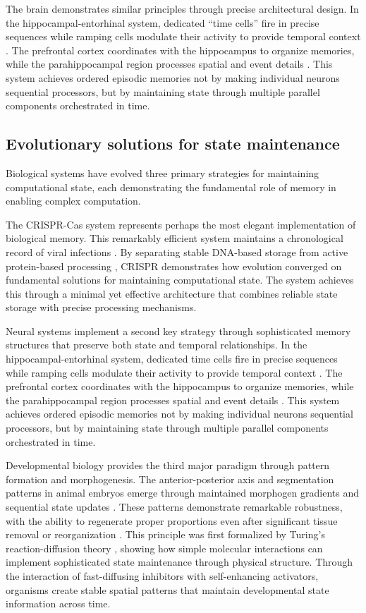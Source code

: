 \documentclass[12pt]{article}
\begin{document}
The brain demonstrates similar principles through precise architectural design.
In the hippocampal-entorhinal system, dedicated ``time cells'' fire in precise sequences while ramping cells modulate their activity to provide temporal context \cite{quentin2019differential}.
The prefrontal cortex coordinates with the hippocampus to organize memories, while the parahippocampal region processes spatial and event details \cite{martini2015information}.
This system achieves ordered episodic memories not by making individual neurons sequential processors, but by maintaining state through multiple parallel components orchestrated in time.

\subsection{Evolutionary solutions for state maintenance}

Biological systems have evolved three primary strategies for maintaining computational state, each demonstrating the fundamental role of memory in enabling complex computation.

The CRISPR-Cas system represents perhaps the most elegant implementation of biological memory.
This remarkably efficient system maintains a chronological record of viral infections \cite{kim2019crispr}.
By separating stable DNA-based storage from active protein-based processing \cite{sadremomtaz2023digital}, CRISPR demonstrates how evolution converged on fundamental solutions for maintaining computational state.
The system achieves this through a minimal yet effective architecture that combines reliable state storage with precise processing mechanisms.

Neural systems implement a second key strategy through sophisticated memory structures that preserve both state and temporal relationships.
In the hippocampal-entorhinal system, dedicated time cells fire in precise sequences while ramping cells modulate their activity to provide temporal context \cite{quentin2019differential}.
The prefrontal cortex coordinates with the hippocampus to organize memories, while the parahippocampal region processes spatial and event details \cite{martini2015information}.
This system achieves ordered episodic memories not by making individual neurons sequential processors, but by maintaining state through multiple parallel components orchestrated in time.

Developmental biology provides the third major paradigm through pattern formation and morphogenesis.
The anterior-posterior axis and segmentation patterns in animal embryos emerge through maintained morphogen gradients and sequential state updates \cite{pastor2020computation}.
These patterns demonstrate remarkable robustness, with the ability to regenerate proper proportions even after significant tissue removal or reorganization \cite{lobo2012towards}.
This principle was first formalized by Turing's reaction-diffusion theory \cite{turing1952chemical}, showing how simple molecular interactions can implement sophisticated state maintenance through physical structure.
Through the interaction of fast-diffusing inhibitors with self-enhancing activators, organisms create stable spatial patterns that maintain developmental state information across time.
\end{document}

